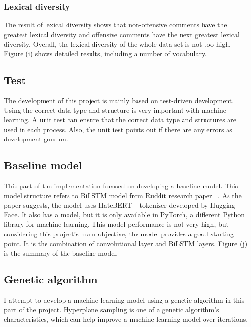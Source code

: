 \documentclass[11pt, natbib=false]{article}
\begin{document}
\subsubsection{Lexical diversity}
The result of lexical diversity shows that non-offensive comments have the greatest lexical diversity and offensive comments have the next greatest lexical diversity.
Overall, the lexical diversity of the whole data set is not too high.
Figure (i) shows detailed results, including a number of vocabulary.

\subsection{Test}
The development of this project is mainly based on test-driven development.
Using the correct data type and structure is very important with machine learning.
A unit test can ensure that the correct data type and structures are used in each process.
Also, the unit test points out if there are any errors as development goes on.

\subsection{Baseline model}
This part of the implementation focused on developing a baseline model.
This model structure refers to BiLSTM model from Ruddit research paper ~\cite{hada2021ruddit}.
As the paper suggests, the model uses HateBERT ~\cite{caselli2020hatebert} tokenizer developed by Hugging Face.
It also has a model, but it is only available in PyTorch, a different Python library for machine learning.
This model performance is not very high, but considering this project's main objective, the model provides a good starting point.
It is the combination of convolutional layer and BiLSTM layers.
Figure (j) is the summary of the baseline model.

\subsection{Genetic algorithm}
I attempt to develop a machine learning model using a genetic algorithm in this part of the project.
Hyperplane sampling is one of a genetic algorithm's characteristics, which can help improve a machine learning model over iterations.
\end{document}
